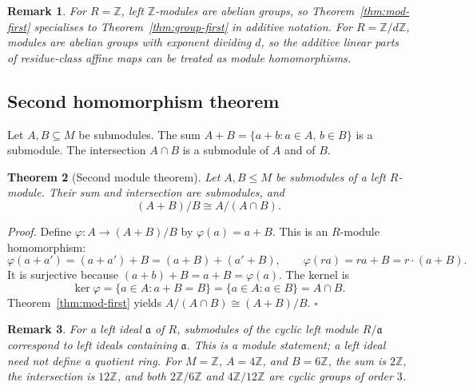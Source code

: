\documentclass[11pt,letterpaper]{article}
\newcommand{\Z}{\mathbb{Z}}
\newcommand{\Map}[3]{#1 \colon #2 \to #3}
\newtheorem{theorem}{Theorem}
\newtheorem{remark}[theorem]{Remark}
\newenvironment{proof}{\noindent\textit{Proof.}}{\hfill\(\square\)}
\begin{document}
\begin{remark}
For \(R=\Z\), left \(\Z\)-modules are abelian groups, so Theorem~\ref{thm:mod-first} specialises to Theorem~\ref{thm:group-first} in additive notation. For \(R=\Z/d\Z\), modules are abelian groups with exponent dividing \(d\), so the additive linear parts of residue-class affine maps can be treated as module homomorphisms.
\end{remark}

\subsection{Second homomorphism theorem}

Let \(A,B\subseteq M\) be submodules. The sum \(A+B=\{a+b:a\in A,\, b\in B\}\) is a submodule. The intersection \(A\cap B\) is a submodule of \(A\) and of \(B\).

\begin{theorem}[Second module theorem]
\label{thm:mod-second}
Let \(A,B\leq M\) be submodules of a left \(R\)-module. Their sum and intersection are submodules, and
\[
(A+B)/B \cong A/(A\cap B).
\]
\end{theorem}

\begin{proof}
Define \(\Map{\varphi}{A}{(A+B)/B}\) by \(\varphi(a)=a+B\). This is an \(R\)-module homomorphism:
\[
\varphi(a+a')=(a+a')+B=(a+B)+(a'+B),\qquad
\varphi(ra)=ra+B=r\cdot(a+B).
\]
It is surjective because \((a+b)+B=a+B=\varphi(a)\). The kernel is
\[
\ker\varphi=\{a\in A:a+B=B\}=\{a\in A:a\in B\}=A\cap B.
\]
Theorem~\ref{thm:mod-first} yields \(A/(A\cap B)\cong(A+B)/B\).
\end{proof}

\begin{center}
\end{center}

\begin{remark}
For a left ideal \(\mathfrak{a}\) of \(R\), submodules of the cyclic left module \(R/\mathfrak{a}\) correspond to left ideals containing \(\mathfrak{a}\). This is a module statement; a left ideal need not define a quotient ring. For \(M=\Z\), \(A=4\Z\), and \(B=6\Z\), the sum is \(2\Z\), the intersection is \(12\Z\), and both \(2\Z/6\Z\) and \(4\Z/12\Z\) are cyclic groups of order \(3\).
\end{remark}
\end{document}

